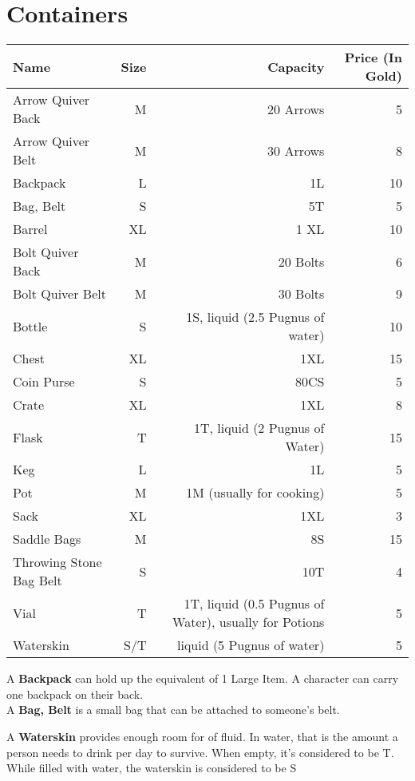 \section{Containers}\label{sec:containers}
\begin{longtable}{l | r | r | r}
	Name & Size & Capacity & Price (In Gold)\\ \hline
	Arrow Quiver Back & M & 20 Arrows & 5 \\
	Arrow Quiver Belt & M & 30 Arrows & 8 \\
	Backpack & L & 1L & 10 \\
	Bag, Belt & S & 5T & 5 \\
	Barrel & XL & 1 XL & 10 \\
	Bolt Quiver Back & M & 20 Bolts & 6 \\
	Bolt Quiver Belt & M & 30 Bolts & 9 \\
	Bottle & S & 1S, liquid (2.5 Pugnus of water) & 10 \\
	Chest & XL & 1XL & 15 \\
	Coin Purse & S & 80CS & 5 \\
	Crate & XL & 1XL & 8 \\
	Flask & T & 1T, liquid (2 Pugnus of Water) & 15 \\
	Keg & L & 1L & 5 \\
	Pot & M & 1M (usually for cooking) & 5 \\
	Sack & XL & 1XL & 3 \\
	Saddle Bags & M & 8S & 15 \\
	Throwing Stone Bag Belt & S & 10T & 4 \\
	Vial & T & 1T, liquid (0.5 Pugnus of Water), usually for Potions & 5 \\
	Waterskin & S/T & liquid (5 Pugnus of water) & 5 \\
\end{longtable}

A \textbf{Backpack} can hold up the equivalent of 1 Large Item.
A character can carry one backpack on their back.\\

A \textbf{Bag, Belt} is a small bag that can be attached to someone's belt.

A \textbf{Waterskin} provides enough room for  of fluid.
In water, that is the amount a person needs to drink per day to survive.
When empty, it's considered to be T.
While filled with water, the waterskin is considered to be S\\